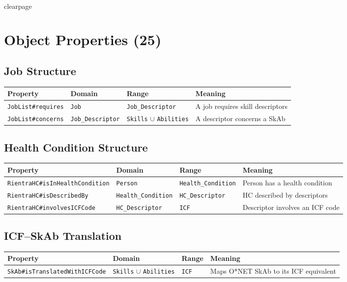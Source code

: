 ﻿\documentclass[12pt,a4paper]{article}
\begin{document}
\\clearpage
\section{Object Properties (25)}

\subsection{Job Structure}
\begin{longtable}{@{}llll@{}}
\toprule
\textbf{Property} & \textbf{Domain} & \textbf{Range} & \textbf{Meaning} \\
\midrule
\endhead
\texttt{JobList\#requires} & \texttt{Job} & \texttt{Job\_Descriptor} & A job requires skill descriptors \\
\texttt{JobList\#concerns} & \texttt{Job\_Descriptor} & \texttt{Skills} $\cup$ \texttt{Abilities} & A descriptor concerns a SkAb \\
\bottomrule
\end{longtable}

\subsection{Health Condition Structure}
\begin{longtable}{@{}llll@{}}
\toprule
\textbf{Property} & \textbf{Domain} & \textbf{Range} & \textbf{Meaning} \\
\midrule
\endhead
\texttt{RientraHC\#isInHealthCondition} & \texttt{Person} & \texttt{Health\_Condition} & Person has a health condition \\
\texttt{RientraHC\#isDescribedBy} & \texttt{Health\_Condition} & \texttt{HC\_Descriptor} & HC described by descriptors \\
\texttt{RientraHC\#involvesICFCode} & \texttt{HC\_Descriptor} & \texttt{ICF} & Descriptor involves an ICF code \\
\bottomrule
\end{longtable}

\subsection{ICF--SkAb Translation}
\begin{longtable}{@{}llll@{}}
\toprule
\textbf{Property} & \textbf{Domain} & \textbf{Range} & \textbf{Meaning} \\
\midrule
\endhead
\texttt{SkAb\#isTranslatedWithICFCode} & \texttt{Skills} $\cup$ \texttt{Abilities} & \texttt{ICF} & Maps O*NET SkAb to its ICF equivalent \\
\bottomrule
\end{longtable}
\end{document}

